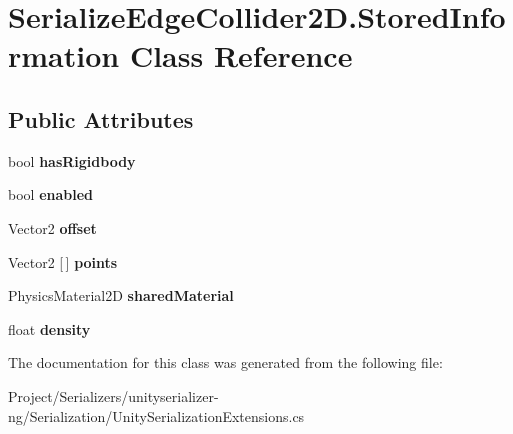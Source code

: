 \hypertarget{class_serialize_edge_collider2_d_1_1_stored_information}{}\section{Serialize\+Edge\+Collider2\+D.\+Stored\+Information Class Reference}
\label{class_serialize_edge_collider2_d_1_1_stored_information}
\subsection*{Public Attributes}
\begin{DoxyCompactItemize}
\item 
\mbox{\label{class_serialize_edge_collider2_d_1_1_stored_information_ad480a1309078ccdd1772de0188625375}} 
bool {\bfseries has\+Rigidbody}
\item 
\mbox{\label{class_serialize_edge_collider2_d_1_1_stored_information_abd727d60c429d3ce666c92f3152ae202}} 
bool {\bfseries enabled}
\item 
\mbox{\label{class_serialize_edge_collider2_d_1_1_stored_information_afb1eceffc5721a6224b7f850e165d3fc}} 
Vector2 {\bfseries offset}
\item 
\mbox{\label{class_serialize_edge_collider2_d_1_1_stored_information_a3ffb0af8c7219156a5aea005cb499f69}} 
Vector2 \mbox{[}$\,$\mbox{]} {\bfseries points}
\item 
\mbox{\label{class_serialize_edge_collider2_d_1_1_stored_information_a0c803dc46a2818960d52a82de7481ca8}} 
Physics\+Material2D {\bfseries shared\+Material}
\item 
\mbox{\label{class_serialize_edge_collider2_d_1_1_stored_information_a511d8f63b8ccba59c22164edd05a3518}} 
float {\bfseries density}
\end{DoxyCompactItemize}


The documentation for this class was generated from the following file\+:\begin{DoxyCompactItemize}
\item 
Project/\+Serializers/unityserializer-\/ng/\+Serialization/Unity\+Serialization\+Extensions.\+cs\end{DoxyCompactItemize}
